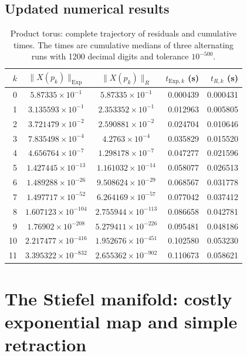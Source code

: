 \documentclass[11pt]{article}
\newcommand{\Exp}{\mathrm{Exp}}
\begin{document}

\subsection*{Updated numerical results}
\begin{table}[H]
\centering
\scriptsize
\setlength{\tabcolsep}{4.2pt}
\begin{tabular}{rccrr}
\toprule
$k$ & $\|X(p_k)\|_{\Exp}$ & $\|X(p_k)\|_R$
& $t_{\Exp,k}$ (s) & $t_{R,k}$ (s)\\
\midrule
0 & $5.87335\times10^{-1}$ & $5.87335\times10^{-1}$ & 0.000439 & 0.000431 \\
1 & $3.135593\times10^{-1}$ & $2.353352\times10^{-1}$ & 0.012963 & 0.005805 \\
2 & $3.721479\times10^{-2}$ & $2.590881\times10^{-2}$ & 0.024704 & 0.010646 \\
3 & $7.835498\times10^{-4}$ & $4.2763\times10^{-4}$ & 0.035829 & 0.015520 \\
4 & $4.656764\times10^{-7}$ & $1.298178\times10^{-7}$ & 0.047277 & 0.021596 \\
5 & $1.427445\times10^{-13}$ & $1.161032\times10^{-14}$ & 0.058077 & 0.026513 \\
6 & $1.489288\times10^{-26}$ & $9.508624\times10^{-29}$ & 0.068567 & 0.031778 \\
7 & $1.497717\times10^{-52}$ & $6.264169\times10^{-57}$ & 0.077042 & 0.037412 \\
8 & $1.607123\times10^{-104}$ & $2.755944\times10^{-113}$ & 0.086658 & 0.042781 \\
9 & $1.76902\times10^{-208}$ & $5.279411\times10^{-226}$ & 0.095481 & 0.048186 \\
10 & $2.217477\times10^{-416}$ & $1.952676\times10^{-451}$ & 0.102580 & 0.053230 \\
11 & $3.395322\times10^{-832}$ & $2.655362\times10^{-902}$ & 0.110673 & 0.058621 \\
\bottomrule
\end{tabular}
\caption{Product torus: complete trajectory of residuals and cumulative times. The times are cumulative medians of three alternating runs with 1200 decimal digits and tolerance $10^{-500}$.}
\label{tab:supp_product_torus}
\end{table}

\section{The Stiefel manifold: costly exponential map and simple retraction}
\label{subsec:stiefel}
\end{document}
